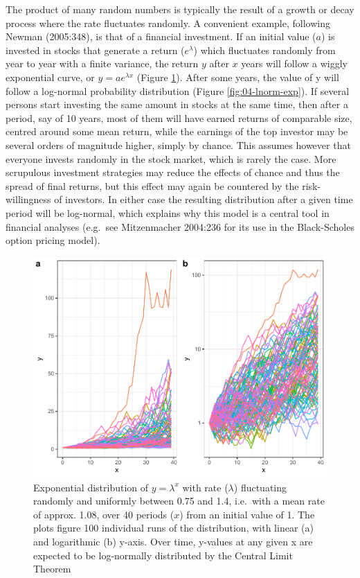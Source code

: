 \documentclass[
  12pt,
]{book}
\begin{document}
The product of many random numbers is typically the result of a growth or decay process where the rate fluctuates randomly. A convenient example, following Newman (2005:348), is that of a financial investment. If an initial value (\(a\)) is invested in stocks that generate a return (\(e^\lambda\)) which fluctuates randomly from year to year with a finite variance, the return \(y\) after \(x\) years will follow a wiggly exponential curve, or \(y = a e^{\lambda x}\) (Figure \ref{fig:04-multi-exp}). After some years, the value of y will follow a log-normal probability distribution (Figure \ref{fig:04-lnorm-exp}). If several persons start investing the same amount in stocks at the same time, then after a period, say of 10 years, most of them will have earned returns of comparable size, centred around some mean return, while the earnings of the top investor may be several orders of magnitude higher, simply by chance. This assumes however that everyone invests randomly in the stock market, which is rarely the case. More scrupulous investment strategies may reduce the effects of chance and thus the spread of final returns, but this effect may again be countered by the risk-willingness of investors. In either case the resulting distribution after a given time period will be log-normal, which explains why this model is a central tool in financial analyses (e.g.~see Mitzenmacher 2004:236 for its use in the Black-Scholes option pricing model).



\begin{figure}

{\centering \includegraphics[width=0.7\linewidth]{bookdown-demo_files/figure-latex/04-multi-exp-1} 

}

\caption{Exponential distribution of \(y = \lambda ^x\) with rate (\(\lambda\)) fluctuating randomly and uniformly between 0.75 and 1.4, i.e.~with a mean rate of approx. 1.08, over 40 periods (\(x\)) from an initial value of 1. The plots figure 100 individual runs of the distribution, with linear (a) and logarithmic (b) y-axis. Over time, y-values at any given x are expected to be log-normally distributed by the Central Limit Theorem}\label{fig:04-multi-exp}
\end{figure}
\end{document}
